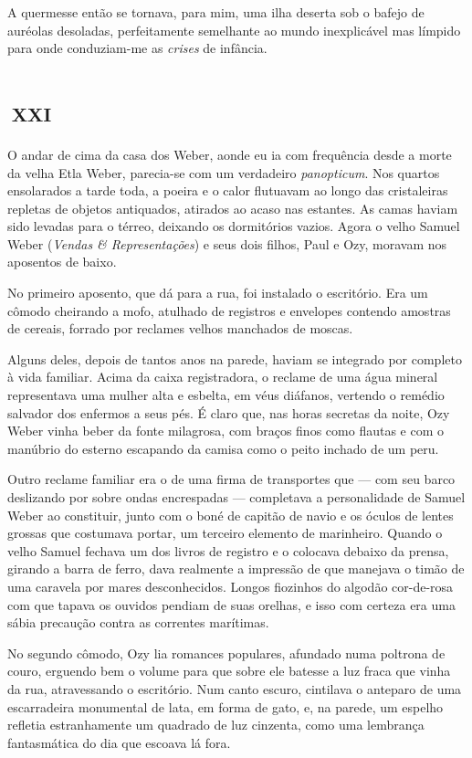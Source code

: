 A quermesse então se tornava, para mim, uma ilha deserta sob o bafejo de auréolas desoladas, perfeitamente semelhante ao mundo inexplicável mas límpido para onde conduziam-me as \textit{crises} de infância.


\chapter*{\small{}\,\Large\centering\textsc{xxi}\,\small{}}

O andar de cima da casa dos Weber, aonde eu ia com frequência desde a morte da velha Etla Weber, parecia-se com um verdadeiro \textit{panopticum}. Nos quartos ensolarados a tarde toda, a poeira e o calor flutuavam ao longo das cristaleiras repletas de objetos antiquados, atirados ao acaso nas estantes. As camas haviam sido levadas para o térreo, deixando os dormitórios vazios. Agora o velho Samuel Weber (\emph{Vendas \& Representações}) e seus dois filhos, Paul e Ozy, moravam nos aposentos de baixo.

No primeiro aposento, que dá para a rua, foi instalado o escritório. Era um cômodo cheirando a mofo, atulhado de registros e envelopes contendo amostras de cereais, forrado por reclames velhos manchados de moscas.

Alguns deles, depois de tantos anos na parede, haviam se integrado por completo à vida familiar. Acima da caixa registradora, o reclame de uma água mineral representava uma mulher alta e esbelta, em véus diáfanos, vertendo o remédio salvador dos enfermos a seus pés. É claro que, nas horas secretas da noite, Ozy Weber vinha beber da fonte milagrosa, com braços finos como flautas e com o manúbrio do esterno escapando da camisa como o peito inchado de um peru.

Outro reclame familiar era o de uma firma de transportes que --- com seu barco deslizando por sobre ondas encrespadas --- completava a personalidade de Samuel Weber ao constituir, junto com o boné de capitão de navio e os óculos de lentes grossas que costumava portar, um terceiro elemento de marinheiro. Quando o velho Samuel fechava um dos livros de registro e o colocava debaixo da prensa, girando a barra de ferro, dava realmente a impressão de que manejava o timão de uma caravela por mares desconhecidos. Longos fiozinhos do algodão cor-de-rosa com que tapava os ouvidos pendiam de suas orelhas, e isso com certeza era uma sábia precaução contra as correntes marítimas.

No segundo cômodo, Ozy lia romances populares, afundado numa poltrona de couro, erguendo bem o volume para que sobre ele batesse a luz fraca que vinha da rua, atravessando o escritório. Num canto escuro, cintilava o anteparo de uma escarradeira monumental de lata, em forma de gato, e, na parede, um espelho refletia estranhamente um quadrado de luz cinzenta, como uma lembrança fantasmática do dia que escoava lá fora.

